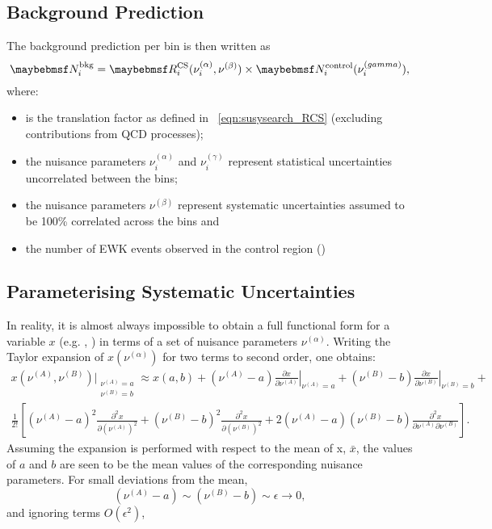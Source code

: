 \subsection{Background Prediction}
The background prediction per bin is then written as
\begin{equation*}
\NBkgi = \RCSi(\nu_i^{(\alpha)}, \nu^{(\beta)}) \times \NControli(\nu_i^{(\gamma)}),
\end{equation*}
where:
\begin{itemize}
\item \RCSi is the translation factor as defined in \eqn~\ref{eqn:susysearch_RCS}
  (excluding contributions from \ac{QCD} processes);
\item the nuisance parameters $\nu_i^{(\alpha)}$ and $\nu_i^{(\gamma)}$ represent
  statistical uncertainties uncorrelated between the bins;
\item the nuisance parameters $\nu^{(\beta)}$ represent systematic
  uncertainties assumed to be 100\% correlated across the bins and
\item \NControli the number of \ac{EWK} events observed in the control region
  (\LPcontrol)
\end{itemize}

\subsection{Parameterising Systematic Uncertainties}
In reality, it is almost always impossible to obtain a full functional form for
a variable $x$ (e.g. \RCSi, \NControli) in terms of a set of nuisance parameters
$\nu^{(\alpha)}$. Writing the Taylor expansion of $x(\nu^{(\alpha)})$ for two terms to
second order, one obtains:
\begin{align*}
 x(\nu^{(A)}, \nu^{(B)})\bigg|_{\substack{\nu^{(A)} = a\\ \nu^{(B)} = b}} \approx
x(a,b) +
(\nu^{(A)} - a)\left.\frac{\partial x}{\partial\nu^{(A)}}\right|_{\nu^{(A)}=a} +
(\nu^{(B)} - b)\left.\frac{\partial x}{\partial\nu^{(B)}}\right|_{\nu^{(B)}=b} +\\
\frac{1}{2!}\left[
(\nu^{(A)} - a)^2 \frac{\partial^2 x}{\partial \left(\nu^{(A)}\right)^2}
+ (\nu^{(B)} - b)^2 \frac{\partial^2 x}{\partial \left(\nu^{(B)}\right)^2}
+ 2(\nu^{(A)} - a)(\nu^{(B)} - b)\frac{\partial^2 x}{\partial
  \nu^{(A)}\partial\nu^{(B)}}
\right].
\end{align*}
Assuming the expansion is performed with respect to the mean of x, $\bar{x}$,
the values of $a$ and $b$ are seen to be the mean values of the corresponding nuisance
parameters. For small deviations from the mean,
\begin{equation*}
 (\nu^{(A)} - a) \sim (\nu^{(B)} - b) \sim \epsilon \longrightarrow 0,
\end{equation*}
and ignoring terms $O(\epsilon^2)$,

